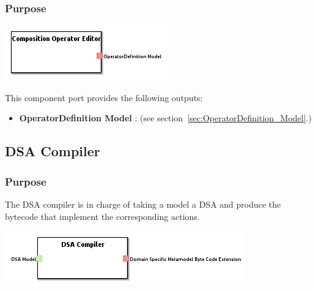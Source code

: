 \documentclass{gemoc} %
\begin{document}

\subsubsection{Purpose}


\begin{center}
\includegraphics*[trim=0.0cm 0.0cm 0cm 0.0cm, clip=true]{../images/generated/Generated_Composition_Operator_Editor.png}
\end{center}


This component port provides the following outputs:
\begin{itemize}
  \item \textbf{OperatorDefinition Model} :
(see section~\ref{sec:OperatorDefinition_Model}.)
\end{itemize}


\subsection{DSA Compiler}
\label{sec:DSA_Compiler}

\subsubsection{Purpose}
The DSA compiler is in charge of taking a model a DSA and produce the bytecode that implement the corresponding actions.


\begin{center}
\includegraphics*[trim=0.0cm 0.0cm 0cm 0.0cm, clip=true]{../images/generated/Generated_DSA_Compiler.png}
\end{center}
\end{document}
